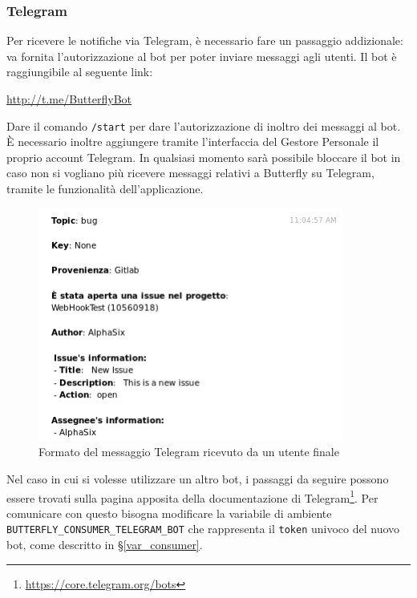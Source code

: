 \subsubsection{Telegram}

Per ricevere le notifiche via Telegram, è necessario fare un passaggio addizionale: va fornita l'autorizzazione al bot per poter inviare messaggi agli utenti.
Il bot è raggiungibile al seguente link:
\begin{center}
    \url{http://t.me/ButterflyBot}
\end{center}

Dare il comando \texttt{/start} per dare l'autorizzazione di inoltro dei messaggi al bot.
È necessario inoltre aggiungere tramite l'interfaccia del Gestore Personale il proprio account Telegram.
In qualsiasi momento sarà possibile bloccare il bot in caso non si vogliano più ricevere messaggi relativi a Butterfly su Telegram, tramite le funzionalità dell'applicazione.
\begin{figure}[H]
	\centering
	\includegraphics[width=10cm]{img/notifica_telegram_1.png}
	\caption{Formato del messaggio Telegram ricevuto da un utente finale}
\end{figure}
Nel caso in cui si volesse utilizzare un altro bot, i passaggi da seguire possono essere trovati sulla pagina apposita della documentazione di Telegram\footnote{\url{https://core.telegram.org/bots}}.
Per comunicare con questo bisogna modificare la variabile di ambiente \texttt{BUTTERFLY\_CONSUMER\_TELEGRAM\_BOT} che rappresenta il \texttt{token} univoco del nuovo bot, come descritto in \S\ref{var_consumer}.
